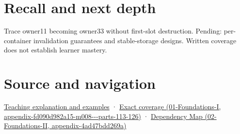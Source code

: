 \section{Recall and next depth}\label{appendix-f9b8b9188c7f-recall-and-next-depth}

Trace owner11 becoming owner33 without first-slot destruction. Pending: per-container invalidation guarantees and stable-storage designs. Written coverage does not establish learner mastery.

\section{Source and navigation}\label{appendix-f9b8b9188c7f-source-and-navigation}

\href{Continuous\%20Notes/Computing\%20Foundations\%20-\%20From\%20Bits\%20to\%20C++\%20and\%20Systems\%20APIs\#When\%20a\%20valid\%20borrow\%20stops\%20naming\%20the\%20intended\%20thing}{Teaching explanation and examples} · \href{../01-Foundations-I/main.pdf\#nameddest=appendix-fd090d982a15-m008---parts-113-126}{Exact coverage (01-Foundations-I, appendix-fd090d982a15-m008-\/-\/-parts-113-126)} · \href{../02-Foundations-II/main.pdf\#nameddest=appendix-4ad47bdd269a}{Dependency Map (02-Foundations-II, appendix-4ad47bdd269a)}
